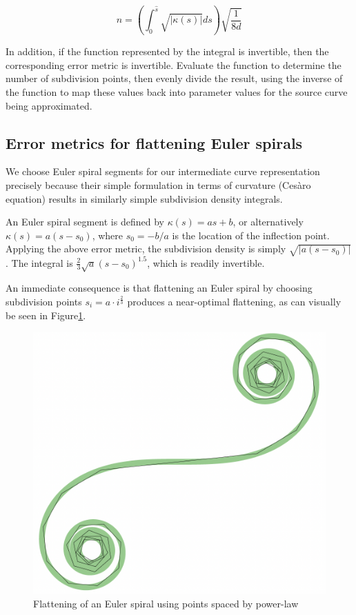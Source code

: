 \documentclass[sigconf, authordraft]{acmart}
\begin{document}
\[
    n = \left(\int_0^{\hat{s}} \sqrt{|\kappa(s)|}ds \right)\sqrt{\frac{1}{8d}}
\]

In addition, if the function represented by the integral is invertible, then the corresponding error metric is invertible. Evaluate the function to determine the number of subdivision points, then evenly divide the result, using the inverse of the function to map these values back into parameter values for the source curve being approximated.

\subsection{Error metrics for flattening Euler spirals}

We choose Euler spiral segments for our intermediate curve representation precisely because their simple formulation in terms of curvature (Cesàro equation) results in similarly simple subdivision density integrals.

An Euler spiral segment is defined by $\kappa(s) = as+b$, or alternatively $\kappa(s) = a(s-s_0)$, where $s_0 = -b/a$ is the location of the inflection point. Applying the above error metric, the subdivision density is simply $\sqrt{|a(s-s_0)|}$. The integral is $\frac{2}{3}\sqrt{a}(s-s_0)^{1.5}$, which is readily invertible.

An immediate consequence is that flattening an Euler spiral by choosing subdivision points $s_i = a\cdot i^\frac{2}{3}$ produces a near-optimal flattening, as can visually be seen in Figure\ref{fig:es_flatten}.

\begin{figure}
    \includegraphics[scale=0.3]{es_flatten}
    \caption{Flattening of an Euler spiral using points spaced by power-law}
    \label{fig:es_flatten}
\end{figure}
\end{document}
